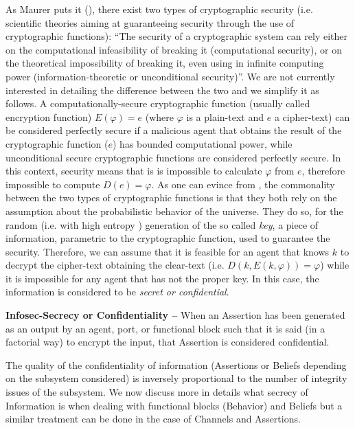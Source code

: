 \label{sec:encryption}
As Maurer puts it (\autocite{Maurer1999information}), there exist two types of
cryptographic security (i.e. scientific theories aiming at guaranteeing
security through the use of cryptographic functions): ``The security  of a
cryptographic system can rely either on the computational infeasibility of
breaking it (computational security), or on the theoretical impossibility of
breaking it, even using in infinite computing power (information-theoretic or
unconditional security)''. We are not currently interested in detailing the
difference between the two and we simplify it as follows. A
computationally-secure cryptographic function (usually called encryption
function) $E(\varphi)=e$ (where $\varphi$ is a plain-text and $e$ a
cipher-text) can be considered perfectly secure if a malicious agent that
obtains the result of the cryptographic function ($e$) has bounded
computational power, while unconditional secure cryptographic functions are
considered perfectly secure. In this context, security means that is is
impossible to calculate $\varphi$ from $e$, therefore impossible to compute
$D(e)=\varphi$.  As one can evince from \autocite{Shannon1948information}, the
commonality between the two types of cryptographic functions is that they both
rely on the assumption about the probabilistic behavior of the universe. They
do so, for the random (i.e. with high entropy
\autocite{Shannon1948information}) generation of the so called \emph{key}, a
piece of information, parametric to the cryptographic function, used to
guarantee the security. Therefore, we can assume that it is feasible for an
agent that knows $k$ to decrypt the cipher-text obtaining the clear-text (i.e. $D(k, E(k,\varphi))=\varphi$)
while it is impossible for any agent that has not the proper key. In this
case, the information is considered to be \emph{secret or confidential}.

\begin{definition}{\bf Infosec-Secrecy or Confidentiality --}\label{def:confidentiality}
	When an Assertion has been generated as an output by an
	agent, port, or functional block such that it is said (in a
	factorial way) to encrypt the input, that Assertion is considered
	confidential.
\end{definition}
The quality of the confidentiality of information (Assertions or Beliefs depending on 
the subsystem considered) is inversely proportional to the number of 
integrity issues of the subsystem.
We now discuss more in details what secrecy of Information is when 
dealing with functional blocks (Behavior) and Beliefs but a similar treatment can be done 
in the case of Channels and Assertions.


